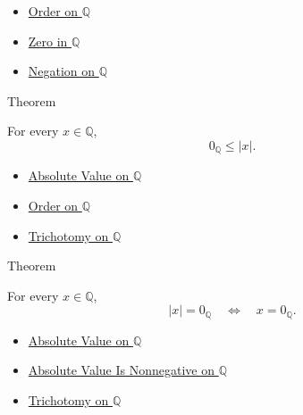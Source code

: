 \begin{dependencies}
\begin{itemize}
  \item \hyperref[def:order-on-q]{Order on $\mathbb{Q}$}
  \item \hyperref[def:zero-in-q]{Zero in $\mathbb{Q}$}
  \item \hyperref[def:negation-on-q-classes]{Negation on $\mathbb{Q}$}
\end{itemize}
\end{dependencies}

\begin{theorembox}{Theorem}
\begin{theorem}
\label{thm:absolute-value-nonnegative-on-q}
For every $x\in\mathbb{Q}$,
\[
0_{\mathbb{Q}}\le |x|.
\]
\end{theorem}
\end{theorembox}

\begin{dependencies}
\begin{itemize}
  \item \hyperref[def:absolute-value-on-q]{Absolute Value on $\mathbb{Q}$}
  \item \hyperref[def:order-on-q]{Order on $\mathbb{Q}$}
  \item \hyperref[thm:trichotomy-on-q]{Trichotomy on $\mathbb{Q}$}
\end{itemize}
\end{dependencies}

\begin{theorembox}{Theorem}
\begin{theorem}
\label{thm:absolute-value-zero-iff-on-q}
For every $x\in\mathbb{Q}$,
\[
|x|=0_{\mathbb{Q}}
\quad\Longleftrightarrow\quad
x=0_{\mathbb{Q}}.
\]
\end{theorem}
\end{theorembox}

\begin{dependencies}
\begin{itemize}
  \item \hyperref[def:absolute-value-on-q]{Absolute Value on $\mathbb{Q}$}
  \item \hyperref[thm:absolute-value-nonnegative-on-q]{Absolute Value Is Nonnegative on $\mathbb{Q}$}
  \item \hyperref[thm:trichotomy-on-q]{Trichotomy on $\mathbb{Q}$}
\end{itemize}
\end{dependencies}

